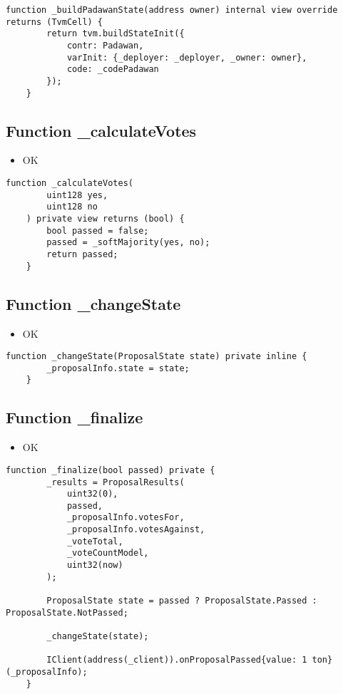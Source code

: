 \begin{lstlisting}[firstnumber=183]
    function _buildPadawanState(address owner) internal view override returns (TvmCell) {
        return tvm.buildStateInit({
            contr: Padawan,
            varInit: {_deployer: _deployer, _owner: owner},
            code: _codePadawan
        });
    }
\end{lstlisting}

\subsection{Function \_{}calculateVotes}

\begin{itemize}
\item OK
\end{itemize}

\begin{lstlisting}[firstnumber=161]
    function _calculateVotes(
        uint128 yes,
        uint128 no
    ) private view returns (bool) {
        bool passed = false;
        passed = _softMajority(yes, no);
        return passed;
    }
\end{lstlisting}

\subsection{Function \_{}changeState}

\begin{itemize}
\item OK
\end{itemize}

\begin{lstlisting}[firstnumber=179]
    function _changeState(ProposalState state) private inline {
        _proposalInfo.state = state;
    }
\end{lstlisting}

\subsection{Function \_{}finalize}

\begin{itemize}
\item OK
\end{itemize}

\begin{lstlisting}[firstnumber=112]
    function _finalize(bool passed) private {
        _results = ProposalResults(
            uint32(0),
            passed,
            _proposalInfo.votesFor,
            _proposalInfo.votesAgainst,
            _voteTotal,
            _voteCountModel,
            uint32(now)
        );

        ProposalState state = passed ? ProposalState.Passed : ProposalState.NotPassed;

        _changeState(state);

        IClient(address(_client)).onProposalPassed{value: 1 ton} (_proposalInfo);
    }
\end{lstlisting}

